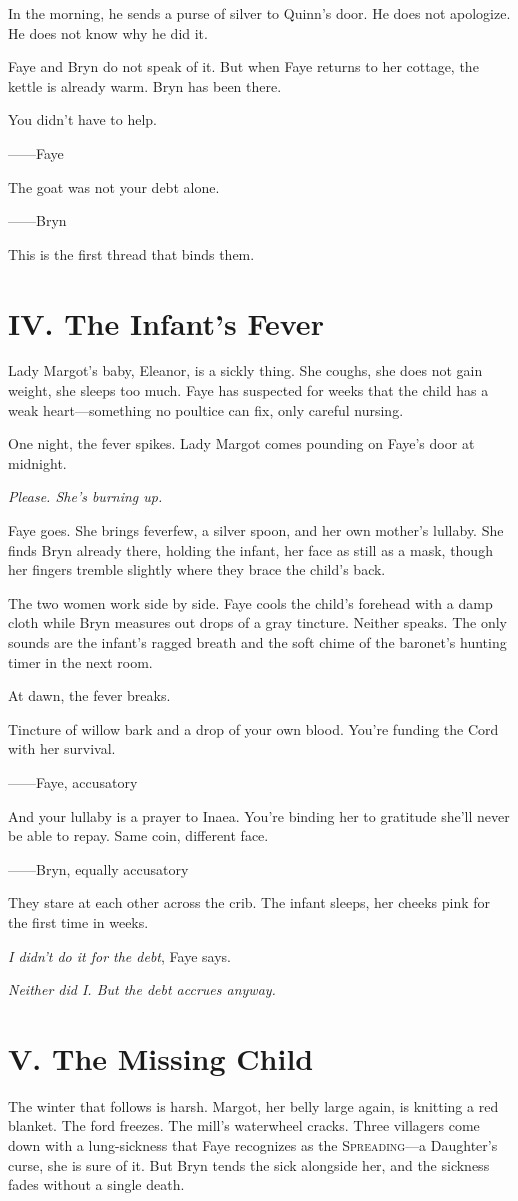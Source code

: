 \documentclass[11pt]{book}
\newcommand{\ledger}[1]{\textsc{#1}}
\begin{document}
In the morning, he sends a purse of silver to Quinn's door. He does not apologize. He does not know why he did it.

Faye and Bryn do not speak of it. But when Faye returns to her cottage, the kettle is already warm. Bryn has been there.

\epigraph{You didn't have to help.}{------Faye}
\epigraph{The goat was not your debt alone.}{------Bryn}

This is the first thread that binds them.

\section*{IV. The Infant's Fever}
Lady Margot's baby, Eleanor, is a sickly thing. She coughs, she does not gain weight, she sleeps too much. Faye has suspected for weeks that the child has a weak heart---something no poultice can fix, only careful nursing.

One night, the fever spikes. Lady Margot comes pounding on Faye's door at midnight.

\textit{Please. She's burning up.}

Faye goes. She brings feverfew, a silver spoon, and her own mother's lullaby. She finds Bryn already there, holding the infant, her face as still as a mask, though her fingers tremble slightly where they brace the child's back.

The two women work side by side. Faye cools the child's forehead with a damp cloth while Bryn measures out drops of a gray tincture. Neither speaks. The only sounds are the infant's ragged breath and the soft chime of the baronet's hunting timer in the next room.

At dawn, the fever breaks.

\epigraph{Tincture of willow bark and a drop of your own blood. You're funding the Cord with her survival.}{------Faye, accusatory}
\epigraph{And your lullaby is a prayer to Inaea. You're binding her to gratitude she'll never be able to repay. Same coin, different face.}{------Bryn, equally accusatory}

They stare at each other across the crib. The infant sleeps, her cheeks pink for the first time in weeks.

\textit{I didn't do it for the debt}, Faye says.

\textit{Neither did I. But the debt accrues anyway.}

\section*{V. The Missing Child}
The winter that follows is harsh. Margot, her belly large again, is knitting a red blanket. The ford freezes. The mill's waterwheel cracks. Three villagers come down with a lung-sickness that Faye recognizes as the \ledger{Spreading}---a Daughter's curse, she is sure of it. But Bryn tends the sick alongside her, and the sickness fades without a single death.
\end{document}
